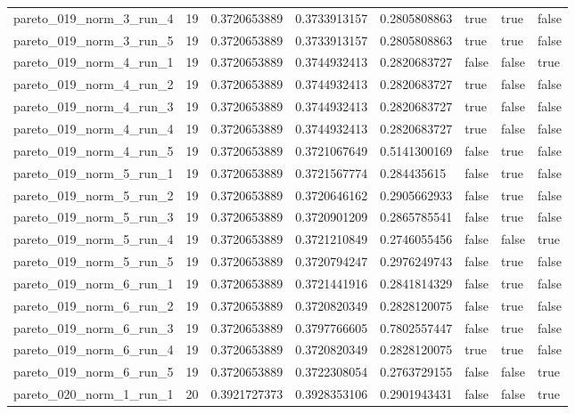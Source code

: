 \begin{tabular}{@{}llllllll@{}}
pareto\_019\_norm\_3\_run\_4 & 19 & 0.3720653889 & 0.3733913157 & 0.2805808863 & true & true & false \\
pareto\_019\_norm\_3\_run\_5 & 19 & 0.3720653889 & 0.3733913157 & 0.2805808863 & true & true & false \\
pareto\_019\_norm\_4\_run\_1 & 19 & 0.3720653889 & 0.3744932413 & 0.2820683727 & false & false & true \\
pareto\_019\_norm\_4\_run\_2 & 19 & 0.3720653889 & 0.3744932413 & 0.2820683727 & true & false & false \\
pareto\_019\_norm\_4\_run\_3 & 19 & 0.3720653889 & 0.3744932413 & 0.2820683727 & true & false & false \\
pareto\_019\_norm\_4\_run\_4 & 19 & 0.3720653889 & 0.3744932413 & 0.2820683727 & true & false & false \\
pareto\_019\_norm\_4\_run\_5 & 19 & 0.3720653889 & 0.3721067649 & 0.5141300169 & false & true & false \\
pareto\_019\_norm\_5\_run\_1 & 19 & 0.3720653889 & 0.3721567774 & 0.284435615 & false & true & false \\
pareto\_019\_norm\_5\_run\_2 & 19 & 0.3720653889 & 0.3720646162 & 0.2905662933 & false & true & false \\
pareto\_019\_norm\_5\_run\_3 & 19 & 0.3720653889 & 0.3720901209 & 0.2865785541 & false & true & false \\
pareto\_019\_norm\_5\_run\_4 & 19 & 0.3720653889 & 0.3721210849 & 0.2746055456 & false & false & true \\
pareto\_019\_norm\_5\_run\_5 & 19 & 0.3720653889 & 0.3720794247 & 0.2976249743 & false & true & false \\
pareto\_019\_norm\_6\_run\_1 & 19 & 0.3720653889 & 0.3721441916 & 0.2841814329 & false & true & false \\
pareto\_019\_norm\_6\_run\_2 & 19 & 0.3720653889 & 0.3720820349 & 0.2828120075 & false & true & false \\
pareto\_019\_norm\_6\_run\_3 & 19 & 0.3720653889 & 0.3797766605 & 0.7802557447 & false & true & false \\
pareto\_019\_norm\_6\_run\_4 & 19 & 0.3720653889 & 0.3720820349 & 0.2828120075 & true & true & false \\
pareto\_019\_norm\_6\_run\_5 & 19 & 0.3720653889 & 0.3722308054 & 0.2763729155 & false & false & true \\
pareto\_020\_norm\_1\_run\_1 & 20 & 0.3921727373 & 0.3928353106 & 0.2901943431 & false & false & true \\

\end{tabular}
